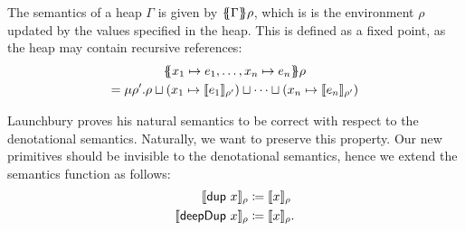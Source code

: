\documentclass[preprint]{sigplanconf}
\theoremstyle{nonumberplain}
\begin{document}
The semantics of a heap $\Gamma$ is given by $\{\!\!\{\Gamma\}\!\!\} \rho$, which is is the environment $\rho$ updated by the values specified in the heap. This is defined as a fixed point, as the heap may contain recursive references:
\begin{multline*}
\{\!\!\{ x_1\mapsto e_1,\ldots,x_n\mapsto e_n\}\!\!\}\rho \\
= \mu \rho'. \rho \sqcup (x_1 \mapsto \llbracket e_1 \rrbracket_{\rho'}) \sqcup \cdots \sqcup (x_n \mapsto \llbracket e_n \rrbracket_{\rho'})
\end{multline*}

Launchbury proves his natural semantics to be correct with respect to the denotational semantics. 
Naturally, we want to preserve this property. Our new primitives should be invisible to the denotational semantics, hence we extend the semantics function as follows:
\begin{align*}
\llbracket \text{\textsf{dup}}\ x \rrbracket_{\rho} &\coloneqq \llbracket x \rrbracket_{\rho} \\
\llbracket \text{\textsf{deepDup}}\ x \rrbracket_{\rho} &\coloneqq \llbracket x \rrbracket_{\rho}.
\end{align*}
\end{document}
